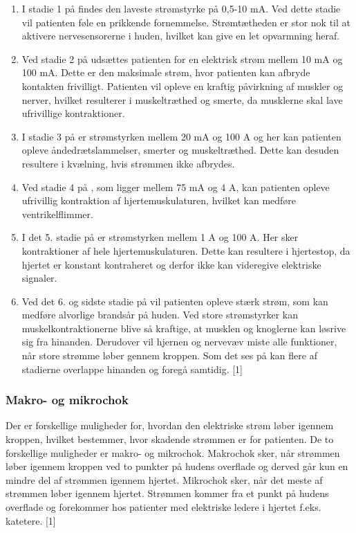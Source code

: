 \begin{enumerate}
\item  I stadie 1 på  findes den laveste strømstyrke på 0,5-10 mA. Ved dette stadie vil patienten føle en prikkende fornemmelse. Strømtætheden er stor nok til at aktivere nervesensorerne i huden, hvilket kan give en let opvarmning heraf. 

\item Ved stadie 2 på  udsættes patienten for en elektrisk strøm mellem 10 mA og 100 mA. Dette er den maksimale strøm, hvor patienten kan afbryde kontakten frivilligt. Patienten vil opleve en kraftig påvirkning af muskler og nerver, hvilket resulterer i muskeltræthed og smerte, da musklerne skal lave ufrivillige kontraktioner.

\item I stadie 3 på  er strømstyrken mellem 20 mA og 100 A og her kan patienten opleve åndedrætslammelser, smerter og muskeltræthed. Dette kan desuden resultere i kvælning, hvis strømmen ikke afbrydes. 

\item Ved stadie 4 på , som ligger mellem 75 mA og 4 A, kan patienten opleve ufrivillig kontraktion af hjertemuskulaturen, hvilket kan medføre ventrikelflimmer. 

\item I det 5. stadie på  er strømstyrken mellem 1 A og 100 A. Her sker kontraktioner af hele hjertemuskulaturen. Dette kan resultere i hjertestop, da hjertet er konstant kontraheret og derfor ikke kan videregive elektriske signaler. 

\item Ved det 6. og sidste stadie på  vil patienten opleve stærk strøm, som kan medføre alvorlige brandsår på huden. Ved store strømstyrker kan muskelkontraktionerne blive så kraftige, at musklen og knoglerne kan løsrive sig fra hinanden. Derudover vil hjernen og nervevæv miste alle funktioner, når store strømme løber gennem kroppen. Som det ses på  kan flere af stadierne overlappe hinanden og foregå samtidig. [1]
\end{enumerate}

\subsubsection{Makro- og mikrochok}

Der er forskellige muligheder for, hvordan den elektriske strøm løber igennem kroppen, hvilket bestemmer, hvor skadende strømmen er for patienten. De to forskellige muligheder er makro- og mikrochok. Makrochok sker, når strømmen løber igennem kroppen ved to punkter på hudens overflade og derved går kun en mindre del af strømmen igennem hjertet. Mikrochok sker, når det meste af strømmen løber igennem hjertet. Strømmen kommer fra et punkt på hudens overflade og forekommer hos patienter med elektriske ledere i hjertet f.eks. katetere. [1]

